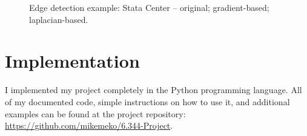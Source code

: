 \documentclass[12pt]{amsart}
\begin{document}
\begin{figure}
\endminipage
\caption{Edge detection example: Stata Center -- original; gradient-based; laplacian-based.}\label{fig:stata}
\end{figure}

\section{Implementation}

I implemented my project completely in the Python programming language. All of my documented code, simple instructions on  how to use it, and additional examples can be found at the project repository: \url{https://github.com/mikemeko/6.344-Project}.
\end{document}
